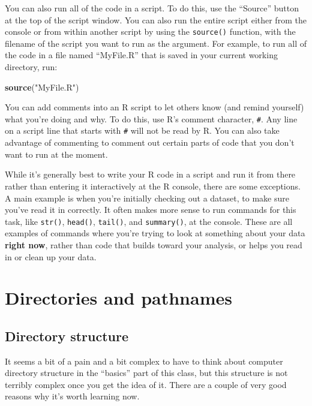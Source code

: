 \documentclass[]{book}
\makeatletter
\newenvironment{Shaded}{\begin{snugshade}}{\end{snugshade}}
\newcommand{\KeywordTok}[1]{\textcolor[rgb]{0.13,0.29,0.53}{\textbf{{#1}}}}
\newcommand{\StringTok}[1]{\textcolor[rgb]{0.31,0.60,0.02}{{#1}}}
\newcommand{\NormalTok}[1]{{#1}}
\newenvironment{kframe}{%
\medskip{}
\setlength{\fboxsep}{.8em}
 \def\at@end@of@kframe{}%
 \ifinner\ifhmode%
  \def\at@end@of@kframe{\end{minipage}}%
  \begin{minipage}{\columnwidth}%
 \fi\fi%
 \def\FrameCommand##1{\hskip\@totalleftmargin \hskip-\fboxsep
 \colorbox{shadecolor}{##1}\hskip-\fboxsep
     \hskip-\linewidth \hskip-\@totalleftmargin \hskip\columnwidth}%
 \MakeFramed {\advance\hsize-\width
   \@totalleftmargin\z@ \linewidth\hsize
   \@setminipage}}%
 {\par\unskip\endMakeFramed%
 \at@end@of@kframe}
\renewenvironment{Shaded}{\begin{kframe}}{\end{kframe}}
\makeatother
\begin{document}
You can also run all of the code in a script. To do this, use the
``Source'' button at the top of the script window. You can also run the
entire script either from the console or from within another script by
using the \texttt{source()} function, with the filename of the script
you want to run as the argument. For example, to run all of the code in
a file named ``MyFile.R'' that is saved in your current working
directory, run:

\begin{Shaded}
\begin{Highlighting}[]
\KeywordTok{source}\NormalTok{(}\StringTok{"MyFile.R"}\NormalTok{)}
\end{Highlighting}
\end{Shaded}

You can add comments into an R script to let others know (and remind
yourself) what you're doing and why. To do this, use R's comment
character, \texttt{\#}. Any line on a script line that starts with
\texttt{\#} will not be read by R. You can also take advantage of
commenting to comment out certain parts of code that you don't want to
run at the moment.

While it's generally best to write your R code in a script and run it
from there rather than entering it interactively at the R console, there
are some exceptions. A main example is when you're initially checking
out a dataset, to make sure you've read it in correctly. It often makes
more sense to run commands for this task, like \texttt{str()},
\texttt{head()}, \texttt{tail()}, and \texttt{summary()}, at the
console. These are all examples of commands where you're trying to look
at something about your data \textbf{right now}, rather than code that
builds toward your analysis, or helps you read in or clean up your data.

\section{Directories and pathnames}\label{directories-and-pathnames}

\subsection{Directory structure}\label{directory-structure}

It seems a bit of a pain and a bit complex to have to think about
computer directory structure in the ``basics'' part of this class, but
this structure is not terribly complex once you get the idea of it.
There are a couple of very good reasons why it's worth learning now.
\end{document}
